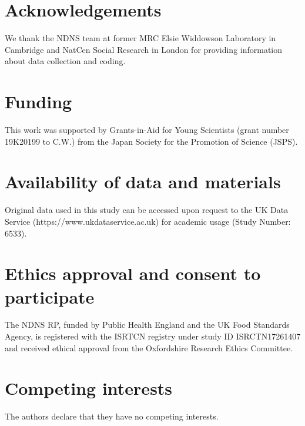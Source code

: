 \documentclass{bmcart}
\begin{document}


\begin{backmatter}

\section*{Acknowledgements}%
We thank the NDNS team at former MRC Elsie Widdowson Laboratory in Cambridge and NatCen Social Research in London for providing information about data collection and coding. 

\section*{Funding}%
This work was supported by Grants-in-Aid for Young Scientists (grant number 19K20199 to C.W.) from the Japan Society for the Promotion of Science (JSPS).


\section*{Availability of data and materials}%
Original data used in this study can be accessed upon request to the UK Data Service (https://www.ukdataservice.ac.uk) for academic usage (Study Number: 6533).

\section*{Ethics approval and consent to participate}%
The NDNS RP, funded by Public Health England and the UK Food Standards Agency, is registered with the ISRTCN registry under study ID ISRCTN17261407 and received ethical approval from the Oxfordshire Research Ethics Committee. 

\section*{Competing interests}
The authors declare that they have no competing interests.


\end{backmatter}
\end{document}
